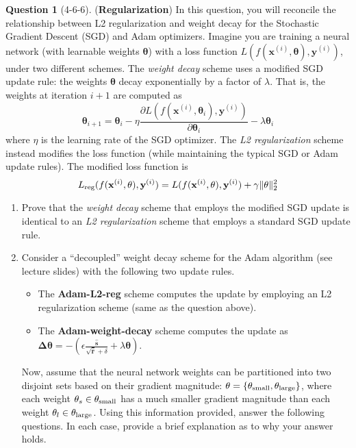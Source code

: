 \documentclass[12pt]{article}
\theoremstyle{definition}
\newtheorem{exercise}{Question}%
\newcommand{\customcommandlreg}{\ensuremath{L_{\textnormal{reg}}(f(\mathbf{x}^{(i)}, \mathbf{\theta}), \mathbf{y}^{(i)})}}
\begin{document}
\begin{exercise}[4-6-6] (\textbf{Regularization})
    \label{ex:weight-decay-and-l2-regularization}
    In this question, you will reconcile the relationship between L2 regularization and weight decay for the Stochastic Gradient Descent (SGD) and Adam optimizers.
    Imagine you are training a neural network (with learnable weights $\mathbf{\theta}$) with a loss function $L(f(\mathbf{x}^{(i)}, \mathbf{\theta}), \mathbf{y}^{(i)})$, under two different schemes.
    The \emph{weight decay} scheme uses a modified SGD update rule: the weights $\mathbf{\theta}$ decay exponentially by a factor of $\lambda$. That is, the weights at iteration $i + 1$ are computed as
    \[
        \mathbf{\theta}_{i + 1} = \mathbf{\theta}_i - \eta \frac{\partial L(f(\mathbf{x}^{(i)}, \mathbf{\theta}_i), \mathbf{y}^{(i)})}{\partial \mathbf{\theta}_i} - \lambda \mathbf{\theta}_i
    \]
    where $\eta$ is the learning rate of the SGD optimizer.
    The \emph{L2 regularization} scheme instead modifies the loss function (while maintaining the typical SGD or Adam update rules). The modified loss function is
    \[
        \customcommandlreg{} = L(f(\mathbf{x}^{(i)}, \mathbf{\theta}), \mathbf{y}^{(i)}) + \gamma \| \mathbf{\theta} \|_2^2
    \]
    \begin{enumerate}[label=\arabic{exercise}.\arabic*]
        \item Prove that the \emph{weight decay} scheme that employs the modified SGD update is identical to an \emph{L2 regularization} scheme that employs a standard SGD update rule.
        \item Consider a ``decoupled'' weight decay scheme for the Adam algorithm (see lecture slides) with the following two update rules.
            \begin{itemize}
                \item The \textbf{Adam-L2-reg} scheme computes the update by employing an L2 regularization scheme (same as the question above).
                \item The \textbf{Adam-weight-decay} scheme computes the update as $\mathbf{\Delta \theta} = - \left( \epsilon \frac{\mathbf{\hat{s}}}{\sqrt{\hat{\mathbf{r}}} + \delta} + \lambda \mathbf{\theta} \right)$.
            \end{itemize}
        Now, assume that the neural network weights can be partitioned into two disjoint sets based on their gradient magnitude: $\mathbf{\theta} = \{\mathbf{\theta_{\textnormal{small}}}, \mathbf{\theta_{\textnormal{large}}}\}$, where each weight $\theta_s \in \mathbf{\theta_{\textnormal{small}}}$ has a much smaller gradient magnitude than each weight $\theta_l \in \mathbf{\theta_{\textnormal{large}}}$. Using this information provided, answer the following questions. In each case, provide a brief explanation as to why your answer holds.

\end{enumerate}
\end{exercise}
\end{document}
